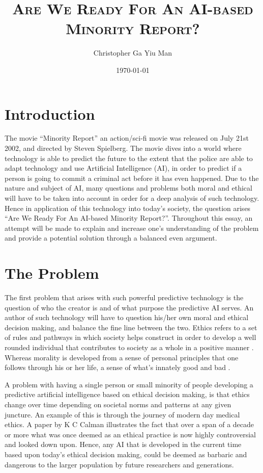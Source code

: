 \documentclass{article}
\title{\textsc{Are We Ready For An AI-based Minority Report?}}
\author{Christopher Ga Yiu Man }
\date{\today}
\begin{document}
\maketitle

\section{Introduction}

The movie “Minority Report” \cite{minority-report_2002} an action/sci-fi movie was released on July 21st 2002, and directed by Steven Spielberg. The movie dives into a world where technology is able to predict the future to the extent that the police are able to adapt technology and use Artificial Intelligence (AI),  in order to predict if a person is going to commit a criminal act before it has even happened. Due to the nature and subject of AI, many questions and problems both moral and ethical will have to be taken into account in order for a deep analysis of such technology. Hence in application of this technology into today's society, the question arises “Are We Ready For An AI-based Minority Report?”. Throughout this essay, an attempt will be made to explain and increase one’s understanding of the problem and provide a potential solution through a balanced even argument. 

\section{The Problem}
The first problem that arises with such powerful predictive technology is the question of who the creator is and of what purpose the predictive AI serves. An author of such technology will have to question his/her own moral and ethical decision making, and balance the fine line between the two. Ethics refers to a set of rules and pathways in which society helps construct in order to develop a well rounded individual that contributes to society as a whole in a positive manner \cite{merriam-webster}. Whereas morality is developed from a sense of personal principles that one follows through his or her life, a sense of what's innately good and bad \cite{cambridge-dictionary}. 

A problem with having a single person or small minority of people developing a predictive artificial intelligence based on ethical decision making, is that ethics change over time depending on societal norms and patterns at any given juncture. An example of this is through the journey of modern day medical ethics. A paper by K C Calman \cite{calman_2004} illustrates the fact that over a span of a decade or more what was once deemed as an ethical practice is now highly controversial and looked down upon. Hence, any AI that is developed in the current time based upon today’s ethical decision making, could be deemed as barbaric and dangerous to the larger population by future researchers and generations.  
\end{document}
